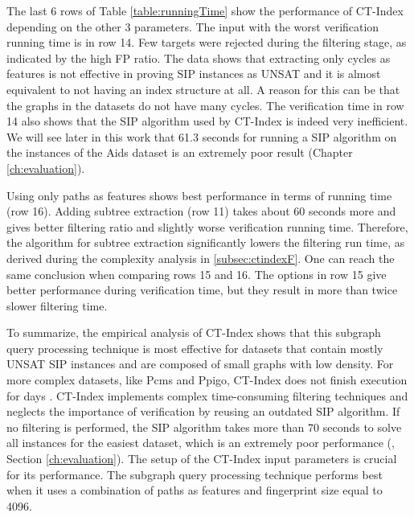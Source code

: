 \documentclass{l4proj}
\begin{document}
The last 6 rows of Table \ref{table:runningTime} show the performance of CT-Index depending on the other 3 parameters. The input with the worst verification running time is in row 14. Few targets were rejected during the filtering stage, as indicated by the high FP ratio. The data shows that extracting only cycles as features is not effective in proving SIP instances as UNSAT and it is almost equivalent to not having an index structure at all. A reason for this can be that the graphs in the datasets do not have many cycles. The verification time in row 14 also shows that the SIP algorithm used by CT-Index is indeed very inefficient. We will see later in this work that 61.3 seconds for running a SIP algorithm on the instances of the Aids dataset is an extremely poor result (Chapter \ref{ch:evaluation}).

Using only paths as features shows best performance in terms of running time (row 16). Adding subtree extraction (row 11) takes about 60 seconds more and gives better filtering ratio and slightly worse verification running time. Therefore, the algorithm for subtree extraction significantly lowers the filtering run time, as derived during the complexity analysis in \ref{subsec:ctindexF}. One can reach the same conclusion when comparing rows 15 and 16. The options in row 15 give better performance during verification time, but they result in more than twice slower filtering time.

To summarize, the empirical analysis of CT-Index shows that this subgraph query processing technique is most effective for datasets that contain mostly UNSAT SIP instances and are composed of small graphs with low density. For more complex datasets, like Pcms and Ppigo, CT-Index does not finish execution for days \cite{foteini}. CT-Index implements complex time-consuming filtering techniques and neglects the importance of verification by reusing an outdated SIP algorithm. If no filtering is performed, the SIP algorithm takes more than 70 seconds to solve all instances for the easiest dataset, which is an extremely poor performance (\cite{CP2015,Solnon:2010}, Section \ref{ch:evaluation}). The setup of the CT-Index input parameters is crucial for its performance. The subgraph query processing technique performs best when it uses a combination of paths as features and fingerprint size equal to 4096. 
\end{document}
